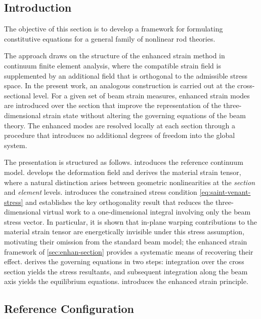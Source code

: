 \subsection{Introduction}

The objective of this section is to develop a framework for formulating constitutive equations for a general family of nonlinear rod theories.

The approach draws on the structure of the enhanced strain method in continuum finite element analysis, where the compatible strain field is supplemented by an additional field that is orthogonal to the admissible stress space. 
In the present work, an analogous construction is carried out at the cross-sectional level. For a given set of beam strain measures, enhanced strain modes are introduced over the section that improve the representation of the three-dimensional strain state without altering the governing equations of the beam theory. 
The enhanced modes are resolved locally at each section through a procedure that introduces no additional degrees of freedom into the global system.

The presentation is structured as follows.
 introduces the reference continuum model. 
 develops the deformation field and derives the material strain tensor, where a natural distinction arises between geometric nonlinearities at the \emph{section} and \emph{element} levels. 
 introduces the constrained stress condition \eqref{eq:saint-venant-stress} and establishes the key orthogonality result that reduces the three-dimensional virtual work to a one-dimensional integral involving only the beam stress vector. 
In particular, it is shown that in-plane warping contributions to the material strain tensor are energetically invisible under this stress assumption, motivating their omission from the standard beam model; the enhanced strain framework of \cref{sec:enhan-section} provides a systematic means of recovering their effect. 
 derives the governing equations in two steps: integration over the cross section yields the stress resultants, and subsequent integration along the beam axis yields the equilibrium equations. 
 introduces the enhanced strain principle. 


\subsection{Reference Configuration}\label{sec:reference-config}

